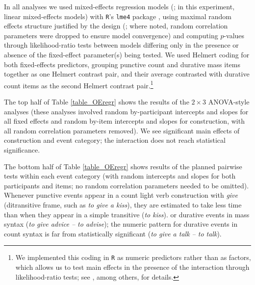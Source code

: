 \documentclass[preprint,12pt,authoryear]{elsarticle}
\begin{document}
In all analyses we used mixed-effects regression models (\citealp{baayen2008mixed}; in this experiment, linear mixed-effects models)  with \texttt{R}'s \texttt{lme4} package \citep{bates2014package}, using maximal random effects structure justified by the design (\citealp{barr2013}; where noted, random correlation parameters were dropped to ensure model convergence) and computing $p$-values through likelihood-ratio tests between models differing only in the presence or absence of the fixed-effect parameter(s) being tested. We used Helmert coding for both fixed-effects predictors, grouping punctive count and durative mass items together as one Helmert contrast pair, and their average contrasted with durative count items as the second Helmert contrast pair.\footnote{We implemented this coding in \texttt{R} as numeric predictors rather than as factors, which allows us to test main effects in the presence of the interaction through likelihood-ratio tests; see \citet{levy2014mainEffects}, among others, for details.}  

The top half of Table \ref{table_OEregr} shows the results of the $2\times 3$ ANOVA-style analyses (these analyses involved random by-participant intercepts and slopes for all fixed effects and random by-item intercepts and slopes for construction, with all random correlation parameters removed).  We see significant main effects of construction and event category; the interaction does not reach statistical significance.

The bottom half of Table \ref{table_OEregr} shows results of the planned pairwise tests within each event category (with random intercepts and slopes for both participants and items; no random correlation parameters needed to be omitted). Whenever punctive events appear in a count light verb construction with \emph{give} (ditransitive frame, such as\emph{ to give a kiss}), they are estimated to take  less time than when they appear in a simple transitive (\emph{to kiss}).  or durative events in mass syntax (\emph{to give advice -- to advise}); the numeric pattern for durative events in count syntax is far from statistically significant (\emph{to give a talk -- to talk}).
\end{document}

